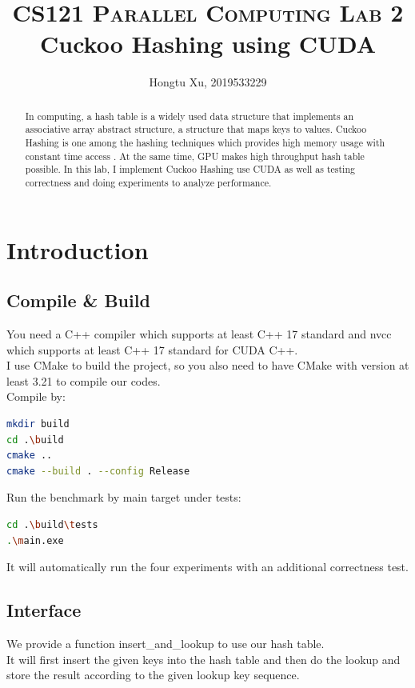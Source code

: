 \documentclass[10pt,twocolumn,letterpaper]{article}
\title{
		\usefont{OT1}{bch}{b}{n}
		\normalfont \normalsize \textsc{CS121 Parallel Computing Lab 2} \\ [10pt]
		\huge Cuckoo Hashing using CUDA \\
}
\author[]{Hongtu Xu, 2019533229}
\affil[]{xuht1@shanghaitech.edu.cn}
\begin{document}
\maketitle

\begin{abstract}

In computing, a hash table is a widely used data structure that implements an associative array abstract structure, a structure that maps keys to values. Cuckoo Hashing is one among the hashing techniques which provides high memory usage with constant time access \cite{Chadalavada2017ImprovingCH}. At the same time, GPU makes high throughput hash table possible. In this lab, I implement Cuckoo Hashing use CUDA as well as testing correctness and doing experiments to analyze performance.

\end{abstract} 

\section{Introduction}
\subsection{Compile \& Build}

You need a C++ compiler which supports at least C++ 17 standard and nvcc which supports at least C++ 17 standard for CUDA C++.\\
I use CMake to build the project, so you also need to have CMake with version at least 3.21 to compile our codes.\\
Compile by:
\begin{lstlisting}[language=bash]
mkdir build
cd .\build
cmake ..
cmake --build . --config Release
\end{lstlisting}
Run the benchmark by main target under tests:
\begin{lstlisting}[language=bash]
cd .\build\tests
.\main.exe
\end{lstlisting}
It will automatically run the four experiments with an additional correctness test.

\subsection{Interface}

We provide a function insert\_and\_lookup to use our hash table. \\
It will first insert the given keys into the hash table and then do the lookup and store the result according to the given lookup key sequence.
\end{document}
